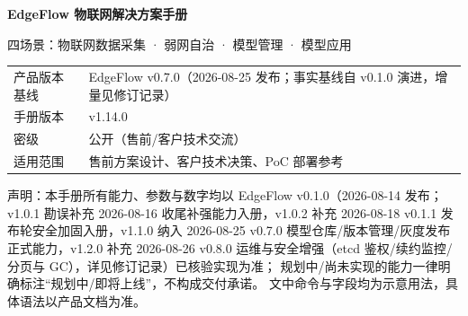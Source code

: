 \documentclass[10.5pt,a4paper,openany]{ctexbook}
\begin{document}
\begin{titlepage}
\thispagestyle{empty}
\vspace*{3.2cm}
{\Huge\bfseries EdgeFlow 物联网解决方案手册\par}
\vspace{10pt}
{\LARGE 四场景：物联网数据采集 · 弱网自治 · 模型管理 · 模型应用\par}
\vspace{3.2cm}
\begin{tabular}{ll}
产品版本基线 & EdgeFlow v0.7.0（2026-08-25 发布；事实基线自 v0.1.0 演进，增量见修订记录）\\
手册版本 & v1.14.0\\
密级 & 公开（售前/客户技术交流）\\
适用范围 & 售前方案设计、客户技术决策、PoC 部署参考\\
\end{tabular}
\vfill
{\small 声明：本手册所有能力、参数与数字均以 EdgeFlow v0.1.0（2026-08-14 发布；v1.0.1 勘误补充 2026-08-16 收尾补强能力入册，v1.0.2 补充 2026-08-18 v0.1.1 发布轮安全加固入册，v1.1.0 纳入 2026-08-25 v0.7.0 模型仓库/版本管理/灰度发布正式能力，v1.2.0 补充 2026-08-26 v0.8.0 运维与安全增强（etcd 鉴权/续约监控/分页与 GC），详见修订记录）已核验实现为准；
规划中/尚未实现的能力一律明确标注“规划中/即将上线”，不构成交付承诺。
文中命令与字段均为示意用法，具体语法以产品文档为准。}
\end{titlepage}

\end{document}
